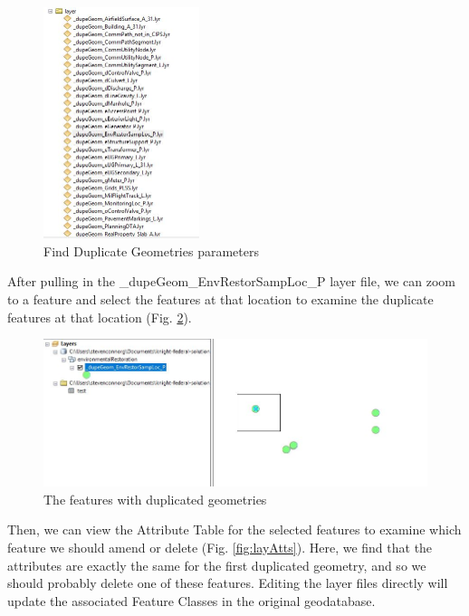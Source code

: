 \documentclass[openany]{book}
\theoremstyle{definition}
\theoremstyle{definition}
\theoremstyle{definition}
\theoremstyle{remark}
\begin{document}
\begin{figure}[H]

{\centering \includegraphics[width=1.79in,]{figures/dupG-lays} 

}

\caption{Find Duplicate Geometries parameters}\label{fig:dupGlays}
\end{figure}

After pulling in the \_dupeGeom\_EnvRestorSampLoc\_P layer file, we can
zoom to a feature and select the features at that location to examine
the duplicate features at that location (Fig. \ref{fig:layFeats}).

\begin{figure}[H]

{\centering \includegraphics[width=4.58in,]{figures/dupG-layFeats} 

}

\caption{The features with duplicated geometries}\label{fig:layFeats}
\end{figure}

Then, we can view the Attribute Table for the selected features to
examine which feature we should amend or delete (Fig.
\ref{fig:layAtts}). Here, we find that the attributes are exactly the
same for the first duplicated geometry, and so we should probably delete
one of these features. Editing the layer files directly will update the
associated Feature Classes in the original geodatabase.
\end{document}
